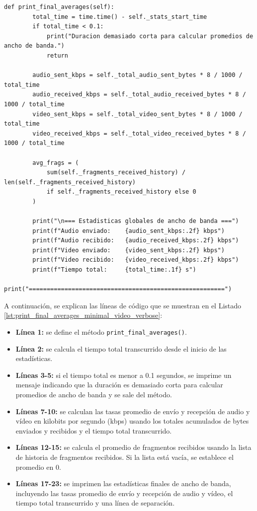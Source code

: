 \begin{lstlisting}[style=pythonstyle, caption={Método \texttt{print\_final\_averages()} de \textit{Minimal\_Video\_verbose}.}, label={lst:print_final_averages_minimal_video_verbose}]
def print_final_averages(self):
        total_time = time.time() - self._stats_start_time
        if total_time < 0.1:
            print("Duracion demasiado corta para calcular promedios de ancho de banda.")
            return

        audio_sent_kbps = self._total_audio_sent_bytes * 8 / 1000 / total_time
        audio_received_kbps = self._total_audio_received_bytes * 8 / 1000 / total_time
        video_sent_kbps = self._total_video_sent_bytes * 8 / 1000 / total_time
        video_received_kbps = self._total_video_received_bytes * 8 / 1000 / total_time

        avg_frags = (
            sum(self._fragments_received_history) / len(self._fragments_received_history)
            if self._fragments_received_history else 0
        )

        print("\n=== Estadisticas globales de ancho de banda ===")
        print(f"Audio enviado:    {audio_sent_kbps:.2f} kbps")
        print(f"Audio recibido:   {audio_received_kbps:.2f} kbps")
        print(f"Video enviado:    {video_sent_kbps:.2f} kbps")
        print(f"Video recibido:   {video_received_kbps:.2f} kbps")
        print(f"Tiempo total:     {total_time:.1f} s")
        print("=======================================================")
\end{lstlisting}
\vspace{\baselineskip}

A continuación, se explican las líneas de código que se muestran en el Listado \ref{lst:print_final_averages_minimal_video_verbose}:
\begin{itemize}
    \item \textbf{Línea 1:} se define el método \texttt{print\_final\_averages()}.
    \item \textbf{Línea 2:} se calcula el tiempo total transcurrido desde el inicio de las estadísticas.
    \item \textbf{Líneas 3-5:} si el tiempo total es menor a 0.1 segundos, se imprime un mensaje indicando que la duración es demasiado corta para calcular promedios de ancho de banda y se sale del método.
    \item \textbf{Líneas 7-10:} se calculan las tasas promedio de envío y recepción de audio y vídeo en kilobits por segundo (kbps) usando los totales acumulados de bytes enviados y recibidos y el tiempo total transcurrido.
    \item \textbf{Líneas 12-15:} se calcula el promedio de fragmentos recibidos usando la lista de historia de fragmentos recibidos. Si la lista está vacía, se establece el promedio en 0.
    \item \textbf{Líneas 17-23:} se imprimen las estadísticas finales de ancho de banda, incluyendo las tasas promedio de envío y recepción de audio y vídeo, el tiempo total transcurrido y una línea de separación.
\end{itemize}

